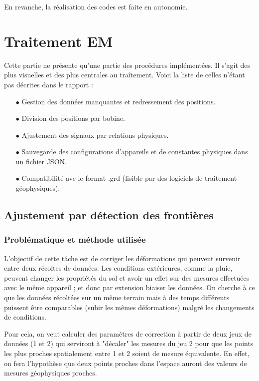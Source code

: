 \documentclass[12pt]{article}
\begin{document}
    En revanche, la réalisation des codes est faite en autonomie.

\newpage
\section{Traitement EM}

    Cette partie ne présente qu'une partie des procédures implémentées. Il s'agit des plus visuelles et des plus centrales au traîtement. Voici la liste de celles n'étant pas décrites dans le rapport :
    \begin{enumerate}
        \item[$\bullet$] Gestion des données manquantes et redressement des positions.
        \item[$\bullet$] Division des positions par bobine.
        \item[$\bullet$] Ajustement des signaux par relations physiques.
        \item[$\bullet$] Sauvegarde des configurations d'appareils et de constantes physiques dans un fichier JSON.
        \item[$\bullet$] Compatibilité ave le format .grd (lisible par des logiciels de traitement géophysiques).

    \end{enumerate}

\subsection{Ajustement par détection des frontières}\label{2-front}
\subsubsection{Problématique et méthode utilisée}
    L'objectif de cette tâche est de corriger les déformations qui peuvent survenir entre deux récoltes de données. Les conditions extérieures, comme la pluie, peuvent changer les propriétés du sol et avoir un effet sur des mesures effectuées avec le même appareil ; et donc par extension biaiser les données. On cherche à ce que les données récoltées sur un même terrain mais à des temps différents puissent être comparables (subir les mêmes déformations) malgré les changements de conditions.

    Pour cela, on veut calculer des paramètres de correction à partir de deux jeux de données (1 et 2) qui serviront à "décaler" les mesures du jeu 2 pour que les points les plus proches spatialement entre 1 et 2 soient de mesure équivalente. En effet, on fera l'hypothèse que deux points proches dans l'espace auront des valeurs de mesures géophysiques proches.
\end{document}
